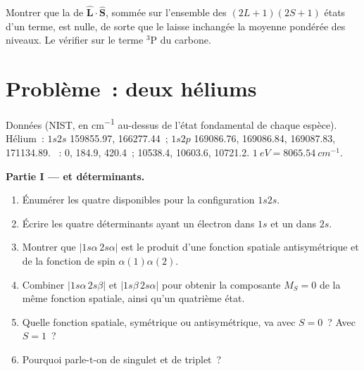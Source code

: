 \begin{exercise}[$\star\star\star$]\label{exo:b3:many-electron-atoms:12}
Montrer que la  de $\hat{\mathbf L}\cdot\hat{\mathbf S}$,
sommée sur l'ensemble des $(2L+1)(2S+1)$ états d'un terme, est nulle, de
sorte que le  laisse inchangée la moyenne pondérée
des niveaux. Le vérifier sur le terme ${}^3$P du carbone.
\end{exercise}

\section{Problème~: deux héliums}

\begin{problem}
\label{pb:b3:many-electron-atoms:1}
Données (NIST, en \unit{cm^{-1}} au-dessus de l'état fondamental de
chaque espèce). Hélium~:
$1s2s$  159855.97,  166277.44~; $1s2p$
 169086.76, 169086.84, 169087.83, 
171134.89. ~:  0, 184.9, 420.4~; 
10538.4, 10603.6, 10721.2. $\qty{1}{eV} = \qty{8065.54}{cm^{-1}}$.

\medskip\noindent\textbf{Partie I ---  et déterminants.}
\begin{enumerate}
  \item Énumérer les quatre  disponibles pour la
        configuration $1s2s$.
  \item Écrire les quatre déterminants ayant un électron dans $1s$ et un
        dans $2s$.
  \item Montrer que $|1s\alpha\,2s\alpha|$ est le produit d'une fonction
        spatiale antisymétrique et de la fonction de spin $\alpha(1)\alpha(2)$.
  \item Combiner $|1s\alpha\,2s\beta|$ et $|1s\beta\,2s\alpha|$ pour obtenir
        la composante $M_S = 0$ de la même fonction spatiale, ainsi qu'un
        quatrième état.
  \item Quelle fonction spatiale, symétrique ou antisymétrique, va avec
        $S = 0$~? Avec $S = 1$~?
  \item Pourquoi parle-t-on de singulet et de triplet~?
\end{enumerate}


\end{problem}
